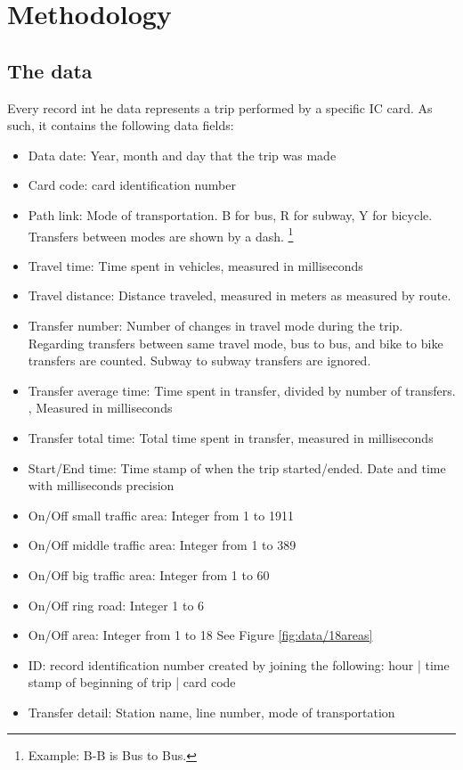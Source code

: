 \documentclass{article}
\begin{document}
\newpage
\section{Methodology}
\subsection{The data}
\label{sec:data}
Every record int he data represents a trip performed by a specific IC card. As such, it contains the following data fields:

\begin{itemize}
\item Data date: Year, month and day that the trip was made
\item Card code: card identification number
\item Path link: Mode of transportation. B for bus, R for subway, Y for bicycle. Transfers between modes are shown by a dash. \footnote{Example: B-B is Bus to Bus.} 
\item Travel time: Time spent in vehicles, measured in milliseconds
\item Travel distance: Distance traveled, measured in meters as measured by route. 
\item Transfer number: Number of changes in travel mode during the trip. Regarding transfers between same travel mode, bus to bus, and bike to bike transfers are counted. Subway to subway transfers are ignored. 
\item Transfer average time: Time spent in transfer, divided by number of transfers. , Measured in milliseconds
\item Transfer total time: Total time spent in transfer, measured in milliseconds
\item Start/End time: Time stamp of when the trip started/ended. Date and time with milliseconds precision
\item On/Off small traffic area: Integer from 1 to 1911
\item On/Off middle traffic area: Integer from 1 to 389
\item On/Off big traffic area: Integer from 1 to 60
\item On/Off ring road: Integer 1 to 6
\item On/Off area: Integer from 1 to 18 See Figure \ref{fig:data/18areas}
\item ID: record identification number created by joining the following: hour | time stamp of beginning of trip | card code
\item Transfer detail: Station name, line number, mode of transportation
\end{itemize}
\end{document}

